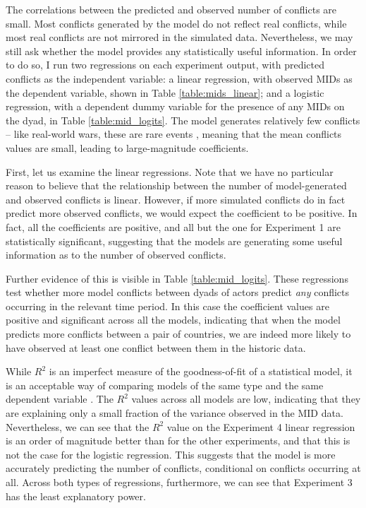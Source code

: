 The correlations between the predicted and observed number of conflicts are small. Most conflicts generated by the model do not reflect real conflicts, while most real conflicts are not mirrored in the simulated data. Nevertheless, we may still ask whether the model provides any statistically useful information. In order to do so, I run two regressions on each experiment output, with predicted conflicts as the independent variable: a linear regression, with observed MIDs as the dependent variable, shown in Table \ref{table:mids_linear}; and a logistic regression, with a dependent dummy variable for the presence of any MIDs on the dyad, in Table \ref{table:mid_logits}. The model generates relatively few conflicts -- like real-world wars, these are rare events \citep{king_2001}, meaning that the mean conflicts values are small, leading to large-magnitude coefficients. 

First, let us examine the linear regressions. Note that we have no particular reason to believe that the relationship between the number of model-generated and observed conflicts is linear. However, if more simulated conflicts do in fact predict more observed conflicts, we would expect the coefficient to be positive. In fact, all the coefficients are positive, and all but the one for Experiment 1 are statistically significant, suggesting that the models are generating some useful information as to the number of observed conflicts.

Further evidence of this is visible in Table \ref{table:mid_logits}. These regressions test whether more model conflicts between dyads of actors predict \emph{any} conflicts occurring in the relevant time period. In this case the coefficient values are positive and significant across all the models, indicating that when the model predicts more conflicts between a pair of countries, we are indeed more likely to have observed at least one conflict between them in the historic data.

While $R^2$ is an imperfect measure of the goodness-of-fit of a statistical model, it is an acceptable way of comparing models of the same type and the same dependent variable \citep{wooldridge_2008}. The $R^2$ values across all models are low, indicating that they are explaining only a small fraction of the variance observed in the MID data. Nevertheless, we can see that the $R^2$ value on the Experiment 4 linear regression is an order of magnitude better than for the other experiments, and that this is not the case for the logistic regression. This suggests that the model is more accurately predicting the number of conflicts, conditional on conflicts occurring at all. Across both types of regressions, furthermore, we can see that Experiment 3 has the least explanatory power.


